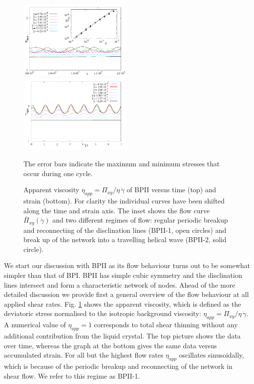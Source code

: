 \documentclass[aps,pre,reprint,superscriptaddress, twocolumn]{revtex4}
\newcommand{\gd}{\dot{\gamma}}
\begin{document}
\begin{figure}[htpb]
\includegraphics[width=0.495\textwidth]{stress_bp2.pdf}
\includegraphics[width=0.495\textwidth]{stress_vs_strain_bp2.pdf}
\caption{Apparent viscosity $\eta_{app}=\Pi_{xy}/\eta\,\gd$ of BPII versus time (top) and strain (bottom). 
For clarity the individual curves have been shifted along the time and strain axis. 
The inset shows the flow curve $\bar{\Pi}_{xy}(\gd)$ and two different regimes of flow: 
regular periodic breakup and reconnecting of the disclination lines (BPII-1, open circles) 
and break up of the network into a travelling helical wave (BPII-2, solid circle).}
The error bars indicate the maximum and minimum stresses that occur during one cycle.
\label{bp2-rheo}
\end{figure}

We start our discussion with BPII as its flow behaviour turns out to be somewhat simpler 
than that of BPI. BPII has simple cubic symmetry and the disclination lines intersect and form a characteristic network of nodes.
Ahead of the more detailed discussion we provide first a general overview of the flow behaviour at all applied shear rates.
Fig. \ref{bp2-rheo} shows the apparent viscosity, which is defined as the 
deviatoric stress normalised to the isotropic background viscosity: 
$\eta_{app}=\Pi_{xy}/\eta\,\gd$.
A numerical value of $\eta_{app}=1$ corresponds to total shear thinning without 
any additional contribution from the liquid crystal.
The top picture shows the data over time, whereas the graph at the bottom gives 
the same data versus accumulated strain.
For all but the highest flow rates $\eta_{app}$ oscillates sinusoidally, which
is because of the periodic breakup and reconnecting of the network in shear flow. We refer to this regime as BPII-1.
\end{document}
